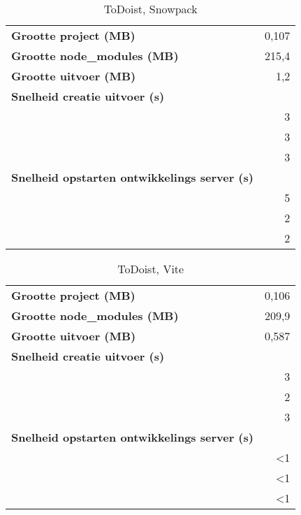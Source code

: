         \begin{table}[h]
            \centering
            \begin{tabular}{lr}
            \textbf{Grootte project (MB)} & 0,107 \\
            \textbf{Grootte node\_modules (MB)} & 215,4 \\
            \textbf{Grootte uitvoer (MB)} & 1,2 \\
            \textbf{Snelheid creatie uitvoer (s)} & \\
            \textbf{} & 3 \\
            \textbf{} & 3 \\
            \textbf{} & 3 \\
            \textbf{Snelheid opstarten ontwikkelings server (s)} & \\
            \textbf{} & 5 \\
            \textbf{} & 2 \\
            \textbf{} & 2
            \end{tabular}
            \caption{ToDoist, Snowpack}
            \end{table}
 
            \begin{table}[h]
                \centering
                \begin{tabular}{lr}
                \textbf{Grootte project (MB)} & 0,106 \\
                \textbf{Grootte node\_modules (MB)} & 209,9 \\
                \textbf{Grootte uitvoer (MB)} & 0,587 \\
                \textbf{Snelheid creatie uitvoer (s)} & \\
                \textbf{} & 3 \\
                \textbf{} & 2 \\
                \textbf{} & 3 \\
                \textbf{Snelheid opstarten ontwikkelings server (s)} & \\
                \textbf{} & <1 \\
                \textbf{} & <1 \\
                \textbf{} & <1
                \end{tabular}
                \caption{ToDoist, Vite}
                \end{table}

